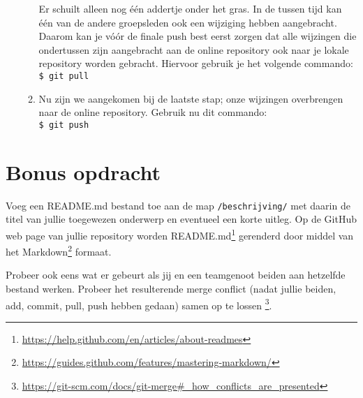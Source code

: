 \documentclass[a4paper]{article}
\begin{document}
\begin{enumerate}
\begin{enumerate}
            Er schuilt alleen nog \'e\'en addertje onder het gras.
            In de tussen tijd kan \'e\'en van de andere groepsleden ook een wijziging hebben aangebracht.
            Daarom kan je v\'o\'or de finale push best eerst zorgen dat alle wijzingen die ondertussen zijn aangebracht aan de online repository ook naar je lokale repository worden gebracht.
            Hiervoor gebruik je het volgende commando: \\
            \texttt{\$ git pull}
        \item Nu zijn we aangekomen bij de laatste stap; onze wijzingen overbrengen naar de online repository.
            Gebruik nu dit commando: \\
            \texttt{\$ git push}
    \end{enumerate}
\end{enumerate}

\section{Bonus opdracht}

Voeg een README.md bestand toe aan de map \texttt{/beschrijving/} met daarin de titel van jullie toegewezen onderwerp en eventueel een korte uitleg.
Op de GitHub web page van jullie repository worden README.md\footnote{\url{https://help.github.com/en/articles/about-readmes}} gerenderd door middel van het Markdown\footnote{\url{https://guides.github.com/features/mastering-markdown/}} formaat.

Probeer ook eens wat er gebeurt als jij en een teamgenoot beiden aan hetzelfde bestand werken.
Probeer het resulterende merge conflict (nadat jullie beiden, add, commit, pull, push hebben gedaan) samen op te lossen \footnote{\url{https://git-scm.com/docs/git-merge#_how_conflicts_are_presented}}.



\end{document}
